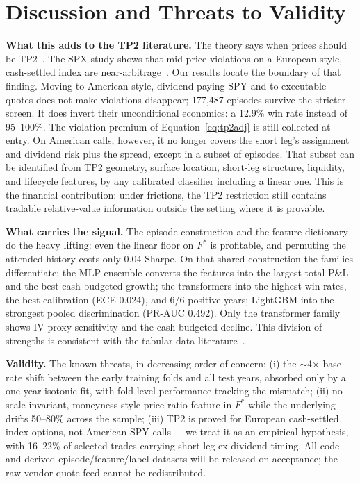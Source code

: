 \documentclass[sigconf,review]{acmart}
\begin{document}
\section{Discussion and Threats to Validity}
\label{sec:limitations}

\noindent\textbf{What this adds to the TP2 literature.} The theory says when prices should be TP2~\cite{glasserman2026tp2theory}. The SPX study shows that mid-price violations on a European-style, cash-settled index are near-arbitrage~\cite{glasserman2025tp2}. Our results locate the boundary of that finding. Moving to American-style, dividend-paying SPY and to executable quotes does not make violations disappear; 177{,}487 episodes survive the stricter screen. It does invert their unconditional economics: a 12.9\% win rate instead of 95--100\%. The violation premium of Equation~\eqref{eq:tp2adj} is still collected at entry. On American calls, however, it no longer covers the short leg's assignment and dividend risk plus the spread, except in a subset of episodes. That subset can be identified from TP2 geometry, surface location, short-leg structure, liquidity, and lifecycle features, by any calibrated classifier including a linear one. This is the financial contribution: under frictions, the TP2 restriction still contains tradable relative-value information outside the setting where it is provable.

\noindent\textbf{What carries the signal.} The episode construction and the feature dictionary do the heavy lifting: even the linear floor on $F^{\ast}$ is profitable, and permuting the attended history costs only 0.04 Sharpe. On that shared construction the families differentiate: the MLP ensemble converts the features into the largest total P\&L and the best cash-budgeted growth; the transformers into the highest win rates, the best calibration (ECE 0.024), and 6/6 positive years; LightGBM into the strongest pooled discrimination (PR-AUC 0.492). Only the transformer family shows IV-proxy sensitivity and the cash-budgeted decline. This division of strengths is consistent with the tabular-data literature~\cite{grinsztajn2022why,gorishniy2021revisiting}.

\noindent\textbf{Validity.} The known threats, in decreasing order of concern: (i) the $\sim$4$\times$ base-rate shift between the early training folds and all test years, absorbed only by a one-year isotonic fit, with fold-level performance tracking the mismatch; (ii) no scale-invariant, moneyness-style price-ratio feature in $F^{\ast}$ while the underlying drifts 50--80\% across the sample; (iii) TP2 is proved for European cash-settled index options, not American SPY calls~\cite{glasserman2026tp2theory,cosma2020earlyexercise}---we treat it as an empirical hypothesis, with 16--22\% of selected trades carrying short-leg ex-dividend timing. All code and derived episode/feature/label datasets will be released on acceptance; the raw vendor quote feed cannot be redistributed.
\end{document}
